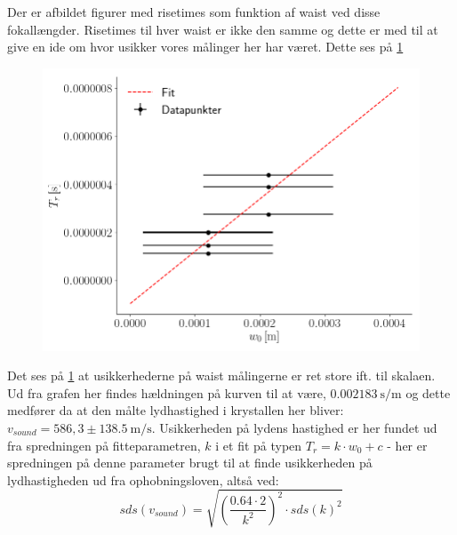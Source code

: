 \documentclass[main]{subfiles}
\begin{document}
Der er afbildet figurer med risetimes som funktion af waist ved disse fokallængder. Risetimes til hver waist er ikke den samme og dette er med til at give en ide om hvor usikker vores målinger her har været. Dette ses på \cref{fig:risetime_fig}
\begin{figure}[H]
  \includegraphics[width=\linewidth]{tegninger/risetime_fig.png}
  \caption{}
  \label{fig:risetime_fig}
\end{figure}
Det ses på \cref{fig:risetime_fig} at usikkerhederne på waist målingerne er ret store ift. til skalaen. Ud fra grafen her findes hældningen på kurven til at være, $\SI{0,002183}{\second\per\meter}$ og dette medfører da at den målte lydhastighed i krystallen her bliver: $v_{sound} = 586,3 \pm 138.5 \ \si{\meter\per\second}$. Usikkerheden på lydens hastighed er her fundet ud fra spredningen på fitteparametren, $k$ i et fit på typen $T_r = k\cdot w_0 +c $ - her er spredningen på denne parameter brugt til at finde usikkerheden på lydhastigheden ud fra ophobningsloven, altså ved:
\begin{equation}
  \nonumber sds(v_{sound}) = \sqrt{\left(\frac{0.64 \cdot 2}{k^2}\right)^2 \cdot sds(k)^2}
\end{equation}
\end{document}
